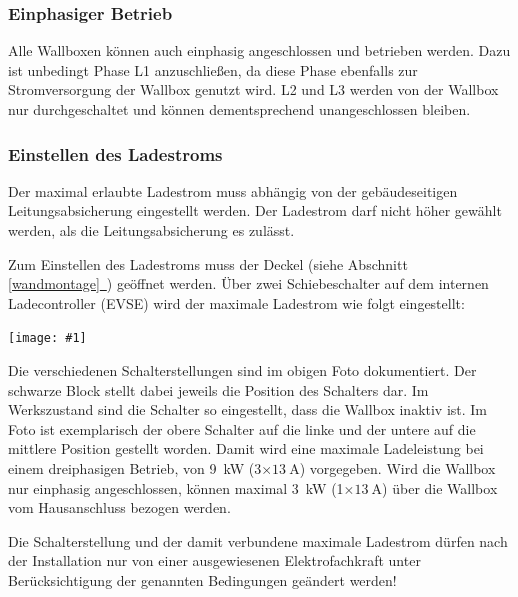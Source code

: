 \documentclass[a4paper,10pt]{article}
\newcommand{\hint}[1]{\begin{tcolorbox}[colback=boxgray,colframe=black,coltext=
white,title=Hinweis,left*=2mm,right*=2mm,boxsep=1mm,bottom=1mm,top=1mm]#1\end{tcolorbox}}
\newcommand{\gfx}[1]{\texttt{[image: \#1]}}
\newcommand*{\fullref}[1]{Abschnitt \hyperref[{#1}]{\ref*{#1}~\nameref*{#1}}}
\begin{document}
\begin{multicols*}{2}
    \subsubsection{Einphasiger Betrieb}
    Alle Wallboxen können auch einphasig angeschlossen und betrieben werden.
    Dazu ist unbedingt Phase L1 anzuschließen, da diese Phase ebenfalls zur
    Stromversorgung der Wallbox genutzt wird. L2 und L3 werden von der Wallbox
    nur durchgeschaltet und können dementsprechend unangeschlossen bleiben.

    \subsubsection{Einstellen des Ladestroms}\label{ladestrom_schalter}
    Der maximal erlaubte Ladestrom muss abhängig von der gebäudeseitigen
    Leitungsabsicherung eingestellt werden. Der Ladestrom darf nicht höher gewählt
    werden, als die Leitungsabsicherung es zulässt.

    Zum Einstellen des Ladestroms muss der Deckel (siehe \fullref{wandmontage})
    geöffnet werden. Über zwei Schiebeschalter auf dem internen Ladecontroller (EVSE) wird der
    maximale Ladestrom wie folgt eingestellt:

    \gfx{./img_warp2/resized/warp2_current_configure_w_caption_600}

    Die verschiedenen Schalterstellungen sind im obigen Foto dokumentiert.
    Der schwarze Block stellt dabei jeweils die Position
    des Schalters dar. Im Werkszustand sind die Schalter so eingestellt,
    dass die Wallbox inaktiv ist. Im Foto ist exemplarisch der obere
    Schalter auf die linke und der untere auf die mittlere Position gestellt
    worden. Damit wird eine maximale Ladeleistung bei einem dreiphasigen
    Betrieb, von \SI{9}{\kilo\watt} (3$\times\SI{13}{\ampere}$) vorgegeben.
    Wird die Wallbox nur einphasig angeschlossen, können maximal
    \SI{3}{\kilo\watt} (1$\times\SI{13}{\ampere}$) über die Wallbox vom Hausanschluss
    bezogen werden.

    \hint{Die Schalterstellung und der damit verbundene maximale Ladestrom dürfen nach der
          Installation nur von einer ausgewiesenen Elektrofachkraft unter
          Berücksichtigung der genannten Bedingungen geändert werden!}


\end{multicols*}
\end{document}
